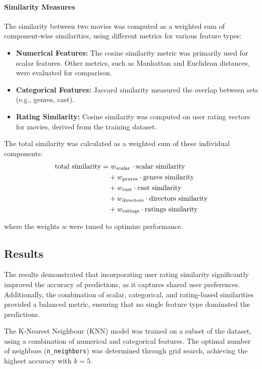 \documentclass[a3paper,12pt]{article}
\begin{document}
\paragraph{Similarity Measures}
The similarity between two movies was computed as a weighted sum of component-wise similarities,
using different metrics for various feature types:

\begin{itemize}
    \item \textbf{Numerical Features:} The cosine similarity metric was primarily used for scalar features. Other metrics, such as Manhattan and Euclidean distances, were evaluated for comparison.
    \item \textbf{Categorical Features:} Jaccard similarity measured the overlap between sets (e.g., genres, cast).
    \item \textbf{Rating Similarity:} Cosine similarity was computed on user rating vectors for movies, derived from the training dataset.
\end{itemize}

The total similarity was calculated as a weighted sum of these individual
components:
\begin{align}
\text{total similarity} = &\ w_{\text{scalar}} \cdot \text{scalar similarity} \notag \\
&+ w_{\text{genres}} \cdot \text{genres similarity} \notag \\
&+ w_{\text{cast}} \cdot \text{cast similarity} \notag \\
&+ w_{\text{directors}} \cdot \text{directors similarity} \notag \\
&+ w_{\text{ratings}} \cdot \text{ratings similarity}
\end{align}

where the weights $w$ were tuned to optimize performance.

\subsection{Results}
The results demonstrated that incorporating user rating similarity significantly improved the accuracy of predictions, as it captures shared user preferences. Additionally, the combination of scalar, categorical, and rating-based similarities provided a balanced metric, ensuring that no single feature type dominated the predictions.

The K-Nearest Neighbour (KNN) model was trained on a subset of the dataset, using a combination of numerical and categorical features. The optimal number of neighbors (\texttt{n\_neighbors}) was determined through grid search, achieving the highest accuracy with \( k = 5 \).
\end{document}
